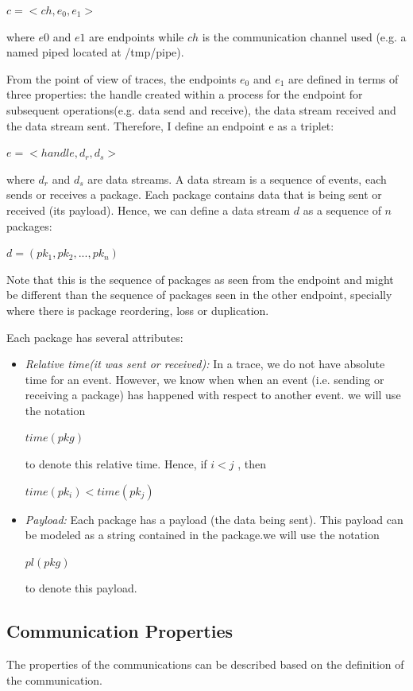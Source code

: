 $c =<ch, e_0, e_1>$

where $e0$ and $e1$ are endpoints while $ch$ is the communication channel used (e.g. a named piped located at /tmp/pipe).

From the point of view of traces, the endpoints $e_0$ and $e_1$ are defined in terms of three properties: the handle created within a process for the endpoint for subsequent operations(e.g. data send and receive), the data stream received and the data stream sent. Therefore, I define an endpoint e as a triplet:

$ e =<handle, d_r, d_s>$

where $d_r$ and $d_s$ are data streams. A data stream is a sequence of events, each sends or receives a package. Each package contains data that is being sent or received (its payload). Hence, we can define a data stream $d$ as a sequence of $n$ packages:

$ d = (pk_1, pk_2, ..., pk_n)$ 

Note that this is the sequence of packages as seen from the endpoint and might be different than the sequence of packages seen in the other endpoint, specially where there is package reordering, loss or duplication.

Each package has several attributes:
\begin{itemize}
\item \textit{Relative time(it was sent or received):} In a trace, we do not have absolute time for an event. However, we know when when an event (i.e. sending or receiving a package) has happened with respect to another event. we will use the notation 

$time(pkg)$ 

to denote this relative time. Hence, if  $i < j $ , then 

$time(pk_i) < time(pk_j)$

\item \textit{Payload:} Each package has a payload (the data being sent). This payload can be modeled as a string contained in the package.we will use the notation 

$pl(pkg)$ 

to denote this payload. 

\end{itemize}


\subsection{Communication Properties}
The properties of the communications can be described based on the definition of the communication.

